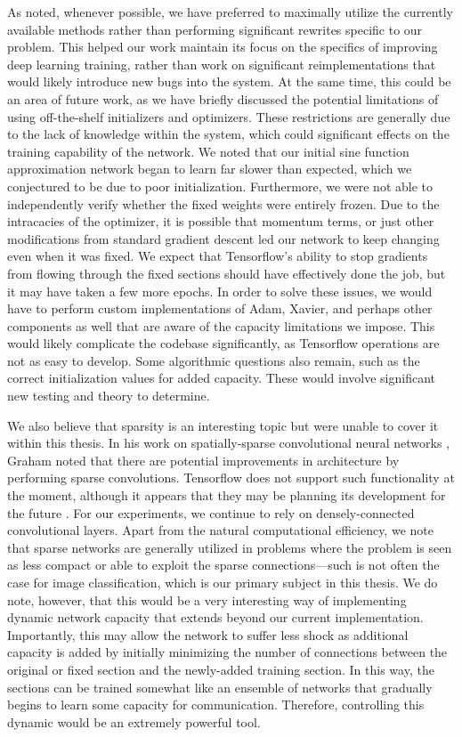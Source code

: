 As noted, whenever possible, we have preferred to maximally utilize the currently available methods rather than performing significant rewrites specific to our problem.
This helped our work maintain its focus on the specifics of improving deep learning training, rather than work on significant reimplementations that would likely introduce new bugs into the system.
At the same time, this could be an area of future work, as we have briefly discussed the potential limitations of using off-the-shelf initializers and optimizers.
These restrictions are generally due to the lack of knowledge within the system, which could significant effects on the training capability of the network.
We noted that our initial sine function approximation network began to learn far slower than expected, which we conjectured to be due to poor initialization.
Furthermore, we were not able to independently verify whether the fixed weights were entirely frozen.
Due to the intracacies of the optimizer, it is possible that momentum terms, or just other modifications from standard gradient descent led our network to keep changing even when it was fixed.
We expect that Tensorflow's ability to stop gradients from flowing through the fixed sections should have effectively done the job, but it may have taken a few more epochs.
In order to solve these issues, we would have to perform custom implementations of Adam, Xavier, and perhaps other components as well that are aware of the capacity limitations we impose.
This would likely complicate the codebase significantly, as Tensorflow operations are not as easy to develop.
Some algorithmic questions also remain, such as the correct initialization values for added capacity.
These would involve significant new testing and theory to determine.

We also believe that sparsity is an interesting topic but were unable to cover it within this thesis.
In his work on spatially-sparse convolutional neural networks \cite{graham2014spatially}, Graham noted that there are potential improvements in architecture by performing sparse convolutions.
Tensorflow does not support such functionality at the moment, although it appears that they may be planning its development for the future \cite{spatiallysparseconv}.
For our experiments, we continue to rely on densely-connected convolutional layers.
Apart from the natural computational efficiency, we note that sparse networks are generally utilized in problems where the problem is seen as less compact or able to exploit the sparse connections---such is not often the case for image classification, which is our primary subject in this thesis.
We do note, however, that this would be a very interesting way of implementing dynamic network capacity that extends beyond our current implementation.
Importantly, this may allow the network to suffer less shock as additional capacity is added by initially minimizing the number of connections between the original or fixed section and the newly-added training section.
In this way, the sections can be trained somewhat like an ensemble of networks that gradually begins to learn some capacity for communication.
Therefore, controlling this dynamic would be an extremely powerful tool.

